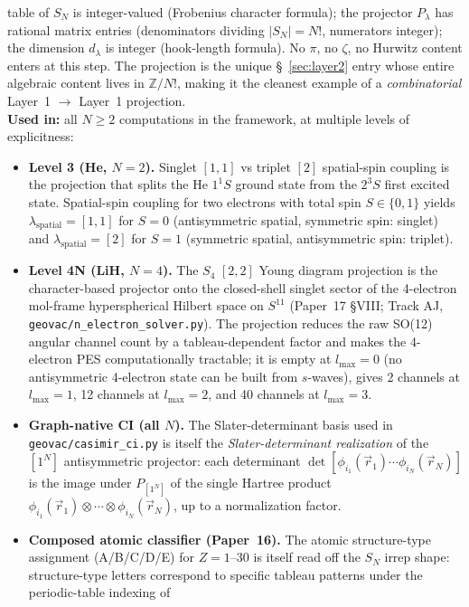 \documentclass[11pt]{article}
\begin{document}
table of $S_N$ is integer-valued (Frobenius character formula); the
projector $P_\lambda$ has rational matrix entries (denominators
dividing $|S_N| = N!$, numerators integer); the dimension $d_\lambda$
is integer (hook-length formula).  No $\pi$, no $\zeta$, no Hurwitz
content enters at this step.  The projection is the unique
\S~\ref{sec:layer2} entry whose entire algebraic content lives in
$\mathbb{Z}/N!$, making it the cleanest example of a
\emph{combinatorial} Layer~1 $\to$ Layer~1 projection.\\
\textbf{Used in:} all $N \geq 2$ computations in the framework, at
multiple levels of explicitness:
\begin{itemize}
\item \textbf{Level 3 (He, $N=2$).}  Singlet $[1,1]$ vs triplet $[2]$
spatial-spin coupling is the projection that splits the He $1^1 S$
ground state from the $2^3 S$ first excited state.  Spatial-spin
coupling for two electrons with total spin $S \in \{0, 1\}$ yields
$\lambda_\text{spatial} = [1,1]$ for $S=0$ (antisymmetric spatial,
symmetric spin: singlet) and $\lambda_\text{spatial} = [2]$ for
$S=1$ (symmetric spatial, antisymmetric spin: triplet).
\item \textbf{Level 4N (LiH, $N=4$).}  The $S_4$ $[2,2]$ Young
diagram projection is the character-based projector onto the
closed-shell singlet sector of the 4-electron mol-frame
hyperspherical Hilbert space on $S^{11}$ (Paper~17 §VIII; Track AJ,
\texttt{geovac/n\_electron\_solver.py}).  The projection reduces the
raw SO(12) angular channel count by a tableau-dependent factor and
makes the 4-electron PES computationally tractable; it is empty at
$l_{\max} = 0$ (no antisymmetric 4-electron state can be built from
$s$-waves), gives 2 channels at $l_{\max} = 1$, 12 channels at
$l_{\max} = 2$, and 40 channels at $l_{\max} = 3$.
\item \textbf{Graph-native CI (all $N$).}  The Slater-determinant
basis used in \texttt{geovac/casimir\_ci.py} is itself the
\emph{Slater-determinant realization} of the $[1^N]$ antisymmetric
projector: each determinant
$\det[\phi_{i_1}(\vec{r}_1)\cdots\phi_{i_N}(\vec{r}_N)]$ is the
image under $P_{[1^N]}$ of the single Hartree product
$\phi_{i_1}(\vec{r}_1)\otimes\cdots\otimes\phi_{i_N}(\vec{r}_N)$,
up to a normalization factor.
\item \textbf{Composed atomic classifier (Paper~16).}  The atomic
structure-type assignment (A/B/C/D/E) for $Z = 1$--$30$ is itself
read off the $S_N$ irrep shape: structure-type letters correspond to
specific tableau patterns under the periodic-table indexing of

\end{itemize}
\end{document}
